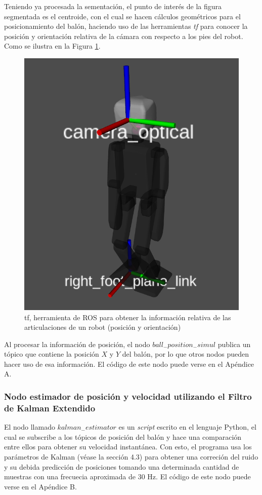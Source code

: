 			Teniendo ya procesada la sementación, el punto de interés de la figura segmentada es el centroide, con el cual se hacen cálculos geométricos para el posicionamiento del balón, haciendo uso de las herramientas \textit{tf} para conocer la posición y orientación relativa de la cámara con respecto a los pies del robot. Como se ilustra en la Figura \ref{fig:tf}.
			
\begin{figure}
	\centering
	\includegraphics[scale=0.2]{images/tf.png}
	\caption{tf, herramienta de ROS para obtener la información relativa de las articulaciones de un robot (posición y orientación)}
	\label{fig:tf}
\end{figure}
	
			Al procesar la información de posición, el nodo $ball_-position_-simul$ publica un tópico que contiene la posición $X$ y $Y$ del balón, por lo que otros nodos pueden hacer uso de esa información. El código de este nodo puede verse en el Apéndice A.
			
			\subsubsection*{Nodo estimador de posición y velocidad utilizando el Filtro de Kalman Extendido}
			El nodo llamado $kalman_-estimator$ es un \textit{script} escrito en el lenguaje Python, el cual se subscribe a los tópicos de posición del balón y hace una comparación entre ellos para obtener su velocidad instantánea. Con esto, el programa usa los parámetros de Kalman (véase la sección 4.3) para obtener una correción del ruido y su debida predicción de posiciones tomando una determinada cantidad de muestras con una frecuecia aproximada de 30 Hz. El código de este nodo puede verse en el Apéndice B.
			

